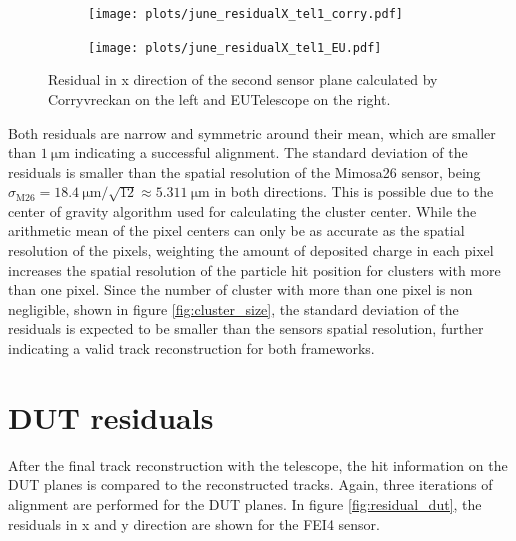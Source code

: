 \begin{figure}
  \hspace{-2.5cm}
  \begin{subfigure}{0.62\textwidth}
      \texttt{[image: plots/june\_residualX\_tel1\_corry.pdf]}
  \end{subfigure}
  \begin{subfigure}{0.62\textwidth}
      \hspace{0.95cm}
      \texttt{[image: plots/june\_residualX\_tel1\_EU.pdf]}
  \end{subfigure}
  \caption{Residual in x direction of the second sensor plane calculated by Corryvreckan on the left and EUTelescope on the right.}
  \label{fig:residualX}
\end{figure}

Both residuals are narrow and symmetric around their mean, which are smaller than $\SI{1}{\micro\meter}$ indicating a successful
alignment. The standard deviation of the residuals is smaller than the spatial resolution of the Mimosa26 sensor, being
$\sigma_{\text{M26}} = \SI{18.4}{\micro\meter}/\sqrt{12} \approx \SI{5.311}{\micro\meter}$ in both directions. This is possible due to
the center of gravity algorithm used for calculating the cluster center. While the arithmetic mean of the pixel centers can
only be as accurate as the spatial resolution of the pixels, weighting the amount of deposited charge in each pixel increases the
spatial resolution of the particle hit position for clusters with more than one pixel. Since the number of cluster with more than
one pixel is non negligible, shown in figure \ref{fig:cluster_size}, the standard deviation of the residuals is expected to be
smaller than the sensors spatial resolution, further indicating a valid track reconstruction for both frameworks.

\section{DUT residuals}
After the final track reconstruction with the telescope, the hit information on the DUT planes is compared to the
reconstructed tracks. Again, three iterations of alignment are performed for the DUT planes. In figure \ref{fig:residual_dut}, the residuals in
x and y direction are shown for the FEI4 sensor.

